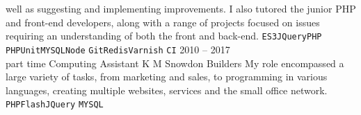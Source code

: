 \documentclass[9pt]{developercv} %
\begin{document}
\begin{entrylist}
{        well as suggesting and implementing improvements. I also tutored the
        junior PHP and front-end developers, along with a range of projects
        focused on issues requiring an understanding of both the front and
        back-end.
        \texttt{ES3}\slashsep\texttt{JQuery}\slashsep\texttt{PHP}\slashsep
        \texttt{PHPUnit}\slashsep\texttt{MYSQL}\slashsep\texttt{Node}\slashsep
        \texttt{Git}\slashsep\texttt{Redis}\slashsep\texttt{Varnish}\slashsep
        \texttt{CI}
    }
    \entry 
    {2010 -- 2017\\\footnotesize{part time}}
    {Computing Assistant} {K M Snowdon Builders}
    {
        My role encompassed a large variety of tasks, from marketing and sales, to
        programming in various languages, creating multiple websites, services and
        the small office network.
        \texttt{PHP}\slashsep\texttt{Flash}\slashsep\texttt{JQuery}\slashsep
        \texttt{MYSQL}
    }
\end{entrylist}
\end{document}
